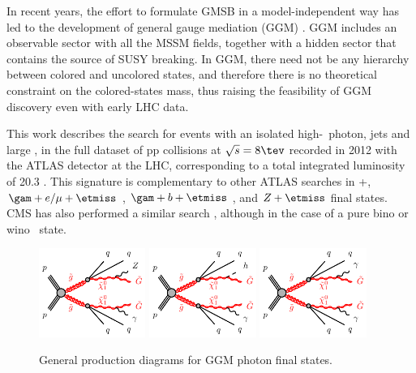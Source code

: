 In recent years, the effort to formulate GMSB in a model-independent way has led to the development
of general gauge mediation (GGM) \cite{Meade:2008wd,Buican:2008ws}. GGM includes an observable sector with all the MSSM fields,
together with a hidden sector that contains the source of SUSY breaking. In GGM, there need not be any
hierarchy between colored and uncolored states, and therefore there is no theoretical constraint on the
colored-states mass, thus raising the feasibility of GGM discovery even with early LHC data.

This work describes the search for events with an isolated high-\pt\ photon, jets and large \etmiss, in the full dataset of pp collisions
at $\sqrt{s}=8\tev$ recorded in 2012 with the ATLAS detector at the LHC, corresponding to a total integrated luminosity of 20.3 \ifb.
This signature is complementary to other ATLAS searches in \gam\gam+\etmiss \cite{Aad2012519,ATLAS-CONF-2014-001}, $\gam+e/\mu+\etmiss$ \cite{ATLAS-CONF-2012-144}, $\gam+b+\etmiss$ \cite{Aad:2012jva},
and $Z+\etmiss$ \cite{ATLAS-CONF-2012-152} final states. CMS has also performed a similar search \cite{CMS-PAS-SUS-12-018,CMS-PAS-SUS-14-004}, although in the case of a pure bino or wino \ninoone\
state.


\begin{figure}[h!]
  \centering
  \includegraphics[width=0.31\textwidth]{figures/gogo-qqqqphZGG-GMSB}
  \includegraphics[width=0.31\textwidth]{figures/gogo-qqqqhphGG-GMSB}
  \includegraphics[width=0.31\textwidth]{figures/gogo-qqqqphphGG-GMSB}
  \caption{General production diagrams for GGM photon final states.}
  \label{fig:GGM_diagrams}
\end{figure}

